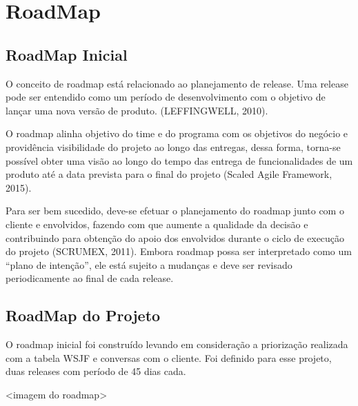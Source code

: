\section{RoadMap}
	\subsection{RoadMap Inicial}

	O conceito de roadmap está relacionado ao planejamento de release. Uma release pode ser entendido como um período de desenvolvimento com o objetivo de lançar uma nova versão de produto. (LEFFINGWELL, 2010). 

	O roadmap alinha objetivo do time e do programa com os objetivos do negócio e providência visibilidade do projeto ao longo das entregas, dessa forma, torna-se possível obter uma visão ao longo do tempo das entrega de funcionalidades de um produto até a data prevista para o final do projeto (Scaled Agile Framework, 2015).

	Para ser bem sucedido, deve-se efetuar o planejamento do roadmap junto com o cliente e envolvidos, fazendo com que aumente a qualidade da decisão e contribuindo para obtenção do apoio dos envolvidos durante o ciclo de execução do projeto (SCRUMEX, 2011). 					
	Embora roadmap possa ser interpretado como um “plano de intenção”, ele está sujeito a mudanças e deve ser revisado periodicamente ao final de cada release.

	\subsection{RoadMap do Projeto}

	O roadmap inicial foi construído levando em consideração a priorização realizada com a tabela WSJF e conversas com o cliente. Foi definido para esse projeto, duas releases com período de 45 dias cada.

	<imagem do roadmap>